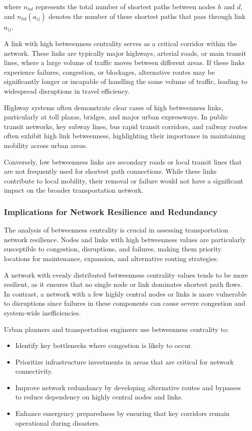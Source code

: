where \( n_{hd} \) represents the total number of shortest paths between nodes \( h \) and \( d \), and \( n_{hd}(a_{ij}) \) denotes the number of these shortest paths that pass through link \( a_{ij} \).

A link with high betweenness centrality serves as a critical corridor within the network. These links are typically major highways, arterial roads, or main transit lines, where a large volume of traffic moves between different areas. If these links experience failures, congestion, or blockages, alternative routes may be significantly longer or incapable of handling the same volume of traffic, leading to widespread disruptions in travel efficiency.

Highway systems often demonstrate clear cases of high betweenness links, particularly at toll plazas, bridges, and major urban expressways. In public transit networks, key subway lines, bus rapid transit corridors, and railway routes often exhibit high link betweenness, highlighting their importance in maintaining mobility across urban areas.

Conversely, low betweenness links are secondary roads or local transit lines that are not frequently used for shortest path connections. While these links contribute to local mobility, their removal or failure would not have a significant impact on the broader transportation network.

\subsubsection{Implications for Network Resilience and Redundancy}
The analysis of betweenness centrality is crucial in assessing transportation network resilience. Nodes and links with high betweenness values are particularly susceptible to congestion, disruptions, and failures, making them priority locations for maintenance, expansion, and alternative routing strategies.

A network with evenly distributed betweenness centrality values tends to be more resilient, as it ensures that no single node or link dominates shortest path flows. In contrast, a network with a few highly central nodes or links is more vulnerable to disruptions since failures in these components can cause severe congestion and system-wide inefficiencies.

Urban planners and transportation engineers use betweenness centrality to:

\begin{itemize}
    \item Identify key bottlenecks where congestion is likely to occur.
    \item Prioritize infrastructure investments in areas that are critical for network connectivity.
    \item Improve network redundancy by developing alternative routes and bypasses to reduce dependency on highly central nodes and links.
    \item Enhance emergency preparedness by ensuring that key corridors remain operational during disasters.
\end{itemize}

